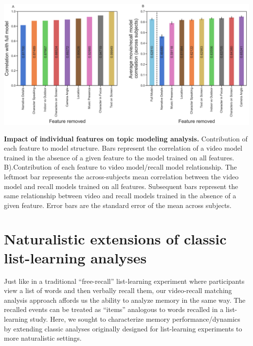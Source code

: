 \documentclass{article}
\begin{document}
\begin{suppfigure}[t!]
\centering
\includegraphics[width=1\textwidth]{figs/supp4_feature_value.pdf}
\caption{\small \textbf{Impact of individual features on topic modeling analysis.} Contribution of each feature to model structure. Bars represent the correlation of a video model trained in the absence of a given feature to the model trained on all features. B).Contribution of each feature to video model/recall model relationship. The leftmost bar represents the across-subjects mean correlation between the video model and recall models trained on all features. Subsequent bars represent the same relationship between video and recall models trained in the absence of a given feature. Error bars are the standard error of the mean across subjects.}
\label{fig:feature-importance}
\end{suppfigure}

\section*{Naturalistic extensions of classic list-learning analyses}
Just like in a traditional ``free-recall'' list-learning experiment where participants view a list of words and then verbally recall them, our video-recall matching analysis approach affords us the ability to analyze memory in the same way. The recalled events can be treated as ``items'' analogous to words recalled in a list-learning study. Here, we sought to characterize memory performance/dynamics by extending classic analyses originally designed for list-learning experiments to more naturalistic settings.
\end{document}
